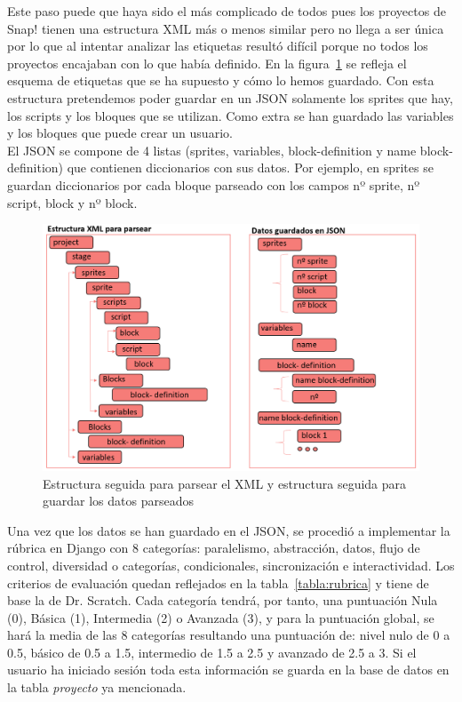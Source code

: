 \documentclass[a4paper, 12pt]{book}
\begin{document}
Este paso puede que haya sido el más complicado de todos pues los proyectos de Snap! tienen una estructura XML más o menos similar pero no llega a ser única por lo que al intentar analizar las etiquetas resultó difícil porque no todos los proyectos encajaban con lo que había definido. En la figura~\ref{figura:tree} se refleja el esquema de etiquetas que se ha supuesto y cómo lo hemos guardado. Con esta estructura pretendemos poder guardar en un JSON solamente  los sprites que hay, los scripts y los bloques que se utilizan. Como extra se han guardado las variables y los bloques que puede crear un usuario. \\
El JSON se compone de 4 listas (sprites, variables, block-definition y name block-definition) que contienen diccionarios con sus datos. Por ejemplo, en sprites se guardan diccionarios por cada bloque parseado con los campos nº sprite, nº script, block y nº block.
\\
\begin{figure}[h]
\centering
            \includegraphics[scale=0.52]{img/tree_xml.PNG}
            \caption{Estructura seguida para parsear el XML y estructura seguida para guardar los datos parseados}
            \label{figura:tree}
    \end{figure}
    
Una vez que los datos se han guardado en el JSON, se procedió a implementar la rúbrica en Django con 8 categorías: paralelismo, abstracción, datos, flujo de control, diversidad o categorías, condicionales, sincronización e interactividad. Los criterios de evaluación quedan reflejados en la tabla~\ref{tabla:rubrica} y tiene de base la  de Dr. Scratch. Cada categoría tendrá, por tanto, una puntuación  Nula (0), Básica (1), Intermedia (2) o Avanzada (3), y para la puntuación global, se hará la media de las 8 categorías resultando una puntuación de: nivel nulo de 0 a 0.5, básico de 0.5 a 1.5, intermedio de 1.5 a 2.5 y avanzado de 2.5 a 3. Si el usuario ha iniciado sesión toda esta información se guarda en la base de datos en la tabla \textit{proyecto} ya mencionada.
\end{document}
